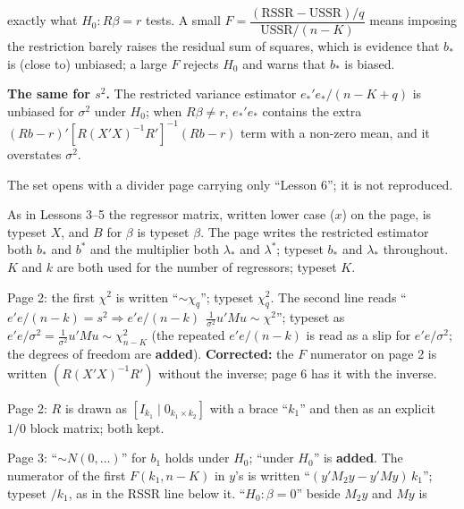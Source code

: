 \documentclass[11pt]{article}
\begin{document}
\begin{flatlist}
        exactly what $H_{0} : R\beta = r$ tests. A small
        $F = \dfrac{(\text{RSSR} - \text{USSR})/q}{\text{USSR}/(n - K)}$ means
        imposing the restriction barely raises the residual sum of squares, which is
        evidence that $b_{*}$ is (close to) unbiased; a large $F$ rejects $H_{0}$
        and warns that $b_{*}$ is biased.
  \item \textbf{The same for $s^{2}$.} The restricted variance estimator
        $e_{*}'e_{*}/(n - K + q)$ is unbiased for $\sigma^{2}$ under $H_{0}$; when
        $R\beta \neq r$, $e_{*}'e_{*}$ contains the extra
        $(Rb - r)'[R(X'X)^{-1}R']^{-1}(Rb - r)$ term with a non-zero mean, and it
        overstates $\sigma^{2}$.
\end{flatlist}

\begin{transcriptnotes}
  \item The set opens with a divider page carrying only ``Lesson 6''; it is not
        reproduced.
  \item As in Lessons 3--5 the regressor matrix, written lower case ($x$) on the page,
        is typeset $X$, and $B$ for $\beta$ is typeset $\beta$. The page writes the
        restricted estimator both $b_{*}$ and $b^{*}$ and the multiplier both
        $\lambda_{*}$ and $\lambda^{*}$; typeset $b_{*}$ and $\lambda_{*}$ throughout.
        $K$ and $k$ are both used for the number of regressors; typeset $K$.
  \item Page 2: the first $\chi^{2}$ is written ``$\sim \chi_{q}$''; typeset
        $\chi^{2}_{q}$. The second line reads ``$e'e/(n-k) = s^{2} \Rightarrow
        e'e/(n-k)\ \ \tfrac{1}{\sigma^{2}}u'Mu \sim \chi^{2}$''; typeset as
        $e'e/\sigma^{2} = \tfrac{1}{\sigma^{2}}u'Mu \sim \chi^{2}_{n-K}$ (the
        repeated $e'e/(n-k)$ is read as a slip for $e'e/\sigma^{2}$; the degrees of
        freedom are \textbf{added}). \textbf{Corrected:} the $F$ numerator on page 2
        is written $(R(X'X)^{-1}R')$ without the inverse; page 6 has it with the
        inverse.
  \item Page 2: $R$ is drawn as $[I_{k_{1}} \mid 0_{k_{1}\times k_{2}}]$ with a brace
        ``$k_{1}$'' and then as an explicit $1/0$ block matrix; both kept.
  \item Page 3: ``$\sim N(0, \ldots)$'' for $b_{1}$ holds under $H_{0}$; ``under
        $H_{0}$'' is \textbf{added}. The numerator of the first $F(k_{1}, n-K)$ in
        $y$'s is written ``$(y'M_{2}y - y'My)\,k_{1}$''; typeset $/k_{1}$, as in the
        RSSR line below it. ``$H_{0} : \beta = 0$'' beside $M_{2}y$ and $My$ is

\end{transcriptnotes}
\end{document}
